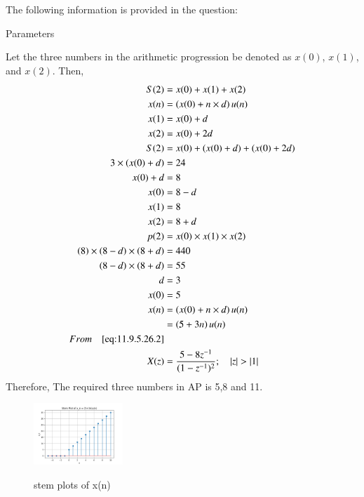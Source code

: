 \documentclass[journal,12pt,twocolumn]{IEEEtran}
\theoremstyle{remark}
\begin{document}
\solution
The following information is provided in the question:
\begin{table}[h]
 	\centering
 	\resizebox{6 cm}{!}{
 		
 	}
 	\vspace{6 pt}
 	\caption{Parameters}
 	\label{tab:my_label} 
 \end{table}
\newline
Let the three numbers in the arithmetic progression be denoted as $x(0)$, $x(1)$, and $x(2)$. Then,
\begin{align}
  S(2) &= x(0) + x(1) + x(2)  \\
   x(n) &= \left(x(0) + n \times d\right) u(n) \\
       x(1) &= x(0) + d \\
       x(2) &= x(0) + 2d \\
     S(2) &= x(0) + \left( x(0) + d \right) + \left( x(0) + 2d \right) \\
          3 \times \left( x(0) + d \right) &= 24 \\
          x(0) + d &= 8 \\
          x(0) &= 8 - d \\
    x(1) &= 8 \\
    \label{eq:eq3} 
    x(2) &= 8 + d \\
   p(2) &= x(0) \times x(1) \times x(2)  \\
    \left(8\right) \times \left(8-d\right) \times \left(8+d\right) &= 440 \\
    \left(8-d\right) \times \left(8+d\right) &= 55 \\
    d &= 3 \\
    x(0) &= 5 \\
    x(n) &= \left(x(0) + n \times d\right) u(n) \\
         &= \left(5 + 3n\right)u(n)\\
         From \quad \eqref{eq:11.9.5.26.2} \\
    X(z) &= \frac{5 - 8z^{-1}}{(1-z^{-1})^2} ; \quad \left\vert z\right\vert>\left\vert1\right\vert
\end{align}
Therefore, The required three numbers in AP is 5,8 and 11.
\begin{figure}[h!]
  \centering
  \includegraphics[width=0.3\textwidth]{figs/stem_plot.png} 
  \label{fig:1}
  \caption{stem plots of x(n)}
\end{figure}
\end{document}
